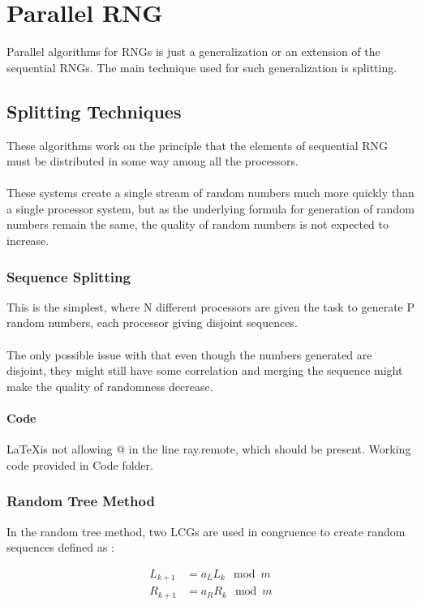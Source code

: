 \chapter{Parallel RNG}
Parallel algorithms for RNGs is just a generalization or 
an extension of the sequential RNGs. The main technique 
used for such generalization is splitting.

\section{Splitting Techniques}
These algorithms work on the principle that the elements of 
sequential RNG must be distributed in some way among all 
the processors.
\\\\
These systems create a single stream of random numbers 
much more quickly than a single processor system, but as 
the underlying formula for generation of random numbers 
remain the same, the quality of random numbers is not 
expected to increase.

\subsection{Sequence Splitting}
This is the simplest, where N different processors are given 
the task to generate P random numbers, each processor giving 
disjoint sequences.
\\\\
The only possible issue with that even though the numbers 
generated are disjoint, they might still have some 
correlation and merging the sequence might make the 
quality of randomness decrease.

\subsubsection{Code}


\noindent \LaTeX is not allowing @ in the line ray.remote, 
which should be present. Working code provided in Code folder.

\subsection{Random Tree Method}
In the random tree method, two LCGs are used in congruence 
to create random sequences defined as :

\begin{align*}
    L_{k+1} &= a_L L_k \mod m\\
    R_{k+1} &= a_R R_k \mod m
\end{align*}

